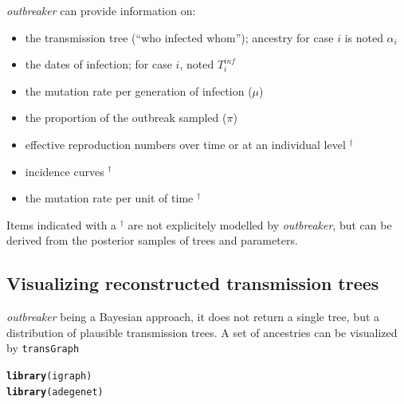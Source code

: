 \documentclass{article}\usepackage[]{graphicx}\usepackage[]{color}
\makeatletter
\newcommand{\hlstd}[1]{\textcolor[rgb]{0.345,0.345,0.345}{#1}}%
\newcommand{\hlkwd}[1]{\textcolor[rgb]{0.737,0.353,0.396}{\textbf{#1}}}%
\newenvironment{kframe}{%
 \def\at@end@of@kframe{}%
 \ifinner\ifhmode%
  \def\at@end@of@kframe{\end{minipage}}%
  \begin{minipage}{\columnwidth}%
 \fi\fi%
 \def\FrameCommand##1{\hskip\@totalleftmargin \hskip-\fboxsep
 \colorbox{shadecolor}{##1}\hskip-\fboxsep
     \hskip-\linewidth \hskip-\@totalleftmargin \hskip\columnwidth}%
 \MakeFramed {\advance\hsize-\width
   \@totalleftmargin\z@ \linewidth\hsize
   \@setminipage}}%
 {\par\unskip\endMakeFramed%
 \at@end@of@kframe}
\newenvironment{knitrout}{}{} %
\makeatother
\begin{document}
\textit{outbreaker} can provide information on:
\begin{itemize}
  \item the transmission tree (``who infected whom''); ancestry for case $i$ is noted $\alpha_i$
  \item the dates of infection; for case $i$, noted $T^{inf}_i$
  \item the mutation rate per generation of infection ($\mu$)
  \item the proportion of the outbreak sampled ($\pi$)
  \item effective reproduction numbers over time or at an individual level $^\dagger$
  \item incidence curves $^\dagger$
  \item the mutation rate per unit of time $^\dagger$
\end{itemize}
Items indicated with a $^\dagger$ are not explicitely modelled by \textit{outbreaker}, but can be derived from the
posterior samples of trees and parameters.



\subsection{Visualizing reconstructed transmission trees}

\textit{outbreaker} being a Bayesian approach, it does not return a single tree, but a distribution
of plausible transmission trees.
A set of ancestries can be visualized by \texttt{transGraph}
\begin{knitrout}
\color{fgcolor}\begin{kframe}
\begin{alltt}
\hlkwd{library}\hlstd{(igraph)}
\hlkwd{library}\hlstd{(adegenet)}
\end{alltt}
\end{kframe}
\end{knitrout}
\end{document}
